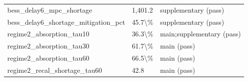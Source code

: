 \begin{table}[H]
\begin{tabular}{lll}
bess\_delay6\_mpc\_shortage & 1,401.2 & supplementary (pass) \\
bess\_delay6\_shortage\_mitigation\_pct & 45.7\textbackslash{}\% & supplementary (pass) \\
regime2\_absorption\_tau10 & 36.3\textbackslash{}\% & main;supplementary (pass) \\
regime2\_absorption\_tau30 & 61.7\textbackslash{}\% & main (pass) \\
regime2\_absorption\_tau60 & 66.5\textbackslash{}\% & main (pass) \\
regime2\_recal\_shortage\_tau60 & 42.8 & main (pass) \\
\bottomrule
\end{tabular}
\end{table}
